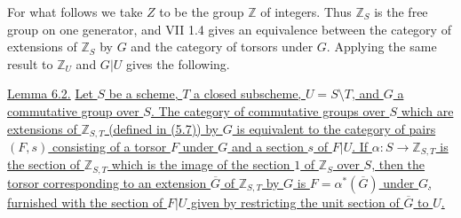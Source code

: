 For what follows we take $Z$ to be the group $\mathbb Z$ of integers.  Thus
$\mathbb Z_S$ is the free group on one generator, and VII 1.4 gives an
equivalence between the category of extensions of $\mathbb Z_S$ by $G$ and
the category of torsors under $G$.  Applying the same result to
$\mathbb Z_U$ and $G|U$ gives the following.

\medskip
\noindent\underline{Lemma 6.2.}  \underline{Let $S$ be a scheme, $T$ a
closed subscheme, $U=S\setminus T$, and $G$ a commutative group over $S$.
The category of commutative groups over $S$ which are extensions of
$\mathbb Z_{S,T}$ (defined in (5.7)) by $G$ is equivalent to the category of
pairs $(F,s)$ consisting of a torsor $F$ under $G$ and a section $s$ of
$F|U$.  If $\alpha:S\to\mathbb Z_{S,T}$ is the section of
$\mathbb Z_{S,T}$ which is the image of the section $1$ of $\mathbb Z_S$
over $S$, then the torsor corresponding to an extension $\overline G$ of
$\mathbb Z_{S,T}$ by $G$ is $F=\alpha^*(\overline G)$ under $G$, furnished
with the section of $F|U$ given by restricting the unit section of
$\overline G$ to $U$.}

